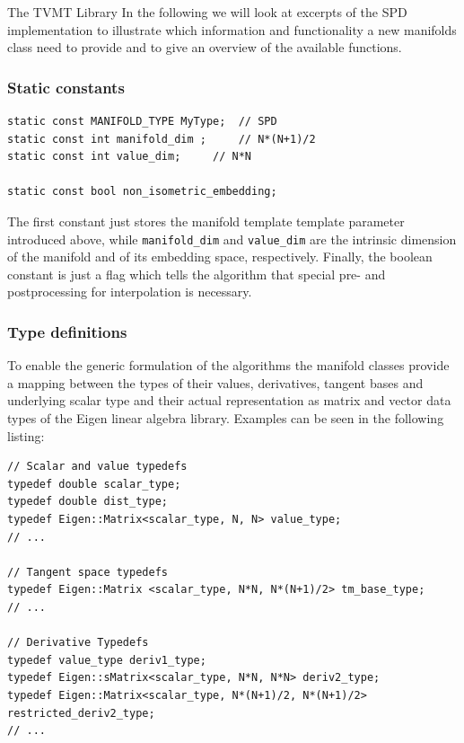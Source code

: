 \begin{chapter}{The TVMT Library}
In the following we will look at excerpts of the SPD implementation to illustrate which information and functionality a new manifolds class need to provide and to give an overview
of the available functions.

\subsubsection{Static constants} %
\label{ssub:Static constants}
\cppinline
\begin{lstlisting}
static const MANIFOLD_TYPE MyType;	// SPD
static const int manifold_dim ;		// N*(N+1)/2
static const int value_dim;		// N*N

static const bool non_isometric_embedding;
\end{lstlisting}
The first constant just stores the manifold template template parameter introduced above, while \texttt{manifold\_dim} and \texttt{value\_dim} are the intrinsic dimension of the manifold
and of its embedding space, respectively. Finally, the boolean constant is just a flag which tells the algorithm that special pre- and postprocessing for interpolation is necessary.\\

\subsubsection{Type definitions} %
\label{ssub:Type definitions}
To enable the generic formulation of the algorithms the manifold classes provide a mapping between the types of their values, derivatives, tangent bases and underlying scalar type and their 
actual representation as matrix and vector data types of the Eigen linear algebra library. Examples can be seen in the following listing:

\cppinline
\begin{lstlisting}
// Scalar and value typedefs
typedef double scalar_type;
typedef double dist_type;
typedef Eigen::Matrix<scalar_type, N, N> value_type;
// ...

// Tangent space typedefs
typedef Eigen::Matrix <scalar_type, N*N, N*(N+1)/2> tm_base_type;
// ...

// Derivative Typedefs
typedef value_type deriv1_type;
typedef Eigen::sMatrix<scalar_type, N*N, N*N> deriv2_type;
typedef Eigen::Matrix<scalar_type, N*(N+1)/2, N*(N+1)/2> restricted_deriv2_type;
// ...
\end{lstlisting}


\end{chapter}
